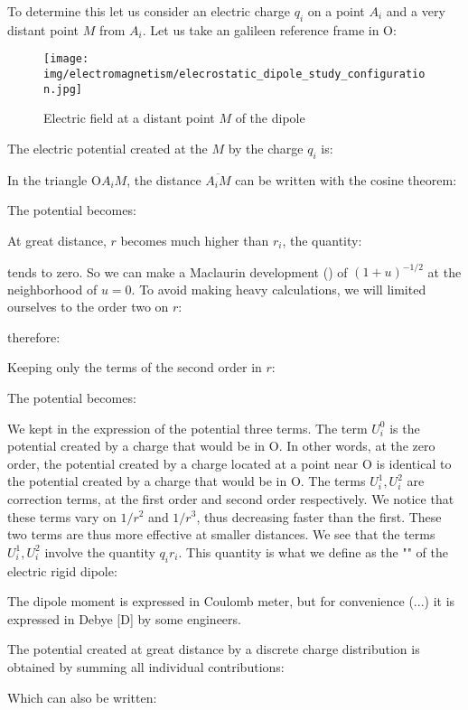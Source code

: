 	To determine this let us consider an electric charge $q_i$ on a point $A_i$ and a very distant point $M$ from $A_i$. Let us take an galileen reference frame in O:
	\begin{figure}[H]
		\centering
		\texttt{[image: img/electromagnetism/elecrostatic\_dipole\_study\_configuration.jpg]}
		\caption{Electric field at a distant point $M$ of the dipole}
	\end{figure}
	The electric potential created at the $M$ by the charge $q_i$ is:
	
	In the triangle $\text{O}A_i M$, the distance $\overline{A_i M}$ can be written with the cosine theorem:
	
	The potential becomes:
	
	At great distance, $r$ becomes much higher than $r_i$, the quantity:
	
	tends to zero. So we can make a Maclaurin development () of $(1+u)^{-1/2}$ at the neighborhood of $u=0$. To avoid making heavy calculations, we will limited ourselves to the order two on $r$:
	
	therefore:
	
	Keeping only the terms of the second order in $r$:
	
	The potential becomes:
	
	We kept in the expression of the potential three terms. The term $U_i^0$ is the potential created by a charge that would be in O. In other words, at the zero order, the potential created by a charge located at a point near O is identical to the potential created by a charge that would be in O. The terms $U_i^1,U_i^2$ are correction terms, at the first order and second order respectively. We notice that these terms vary on $1/r^2$ and $1/r^3$, thus decreasing faster than the first. These two terms are thus more effective at smaller distances.
	We see that the terms $U_i^1,U_i^2$ involve the quantity $q_ir_i$. This quantity is what we define as the "" of the electric rigid dipole:
	
	\begin{tcolorbox}[title=Remark,colframe=black,arc=10pt]
	The dipole moment is expressed in Coulomb meter, but for convenience (...) it is expressed in Debye [D] by some engineers.
	\end{tcolorbox}
	The potential created at great distance by a discrete charge distribution is obtained by summing all individual contributions:
	
	Which can also be written:
	
